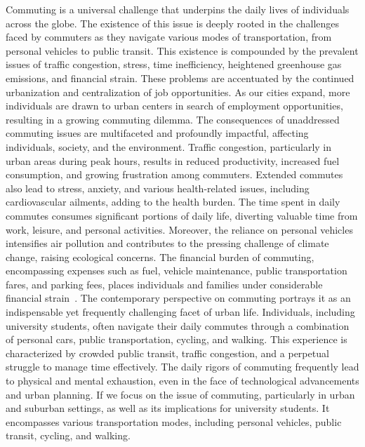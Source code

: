Commuting is a universal challenge that underpins the daily lives of individuals across the globe.
The existence of this issue is deeply rooted in the challenges faced by commuters as they navigate various modes of
transportation, from personal vehicles to public transit.
This existence is compounded by the prevalent issues of traffic congestion, stress, time inefficiency, heightened
greenhouse gas emissions, and financial strain.
These problems are accentuated by the continued urbanization and centralization of job opportunities.
As our cities expand, more individuals are drawn to urban centers in search of employment opportunities, resulting in a
growing commuting dilemma.
The consequences of unaddressed commuting issues are multifaceted and profoundly impactful, affecting individuals,
society, and the environment.
Traffic congestion, particularly in urban areas during peak hours, results in reduced productivity, increased fuel
consumption, and growing frustration among commuters.
Extended commutes also lead to stress, anxiety, and various health-related issues, including cardiovascular ailments,
adding to the health burden.
The time spent in daily commutes consumes significant portions of daily life, diverting valuable time from work,
leisure, and personal activities.
Moreover, the reliance on personal vehicles intensifies air pollution and contributes to the pressing challenge of
climate change, raising ecological concerns.
The financial burden of commuting, encompassing expenses such as fuel, vehicle maintenance, public transportation fares,
and parking fees, places individuals and families under considerable financial strain~\cite{alma9921355859805762}.
The contemporary perspective on commuting portrays it as an indispensable yet frequently challenging facet of urban
life.
Individuals, including university students, often navigate their daily commutes through a combination of personal cars,
public transportation, cycling, and walking.
This experience is characterized by crowded public transit, traffic congestion, and a perpetual struggle to manage time
effectively.
The daily rigors of commuting frequently lead to physical and mental exhaustion, even in the face of technological
advancements and urban planning.
If we focus on the issue of commuting, particularly in urban and suburban settings, as well as its implications for
university students.
It encompasses various transportation modes, including personal vehicles, public transit, cycling, and walking.
